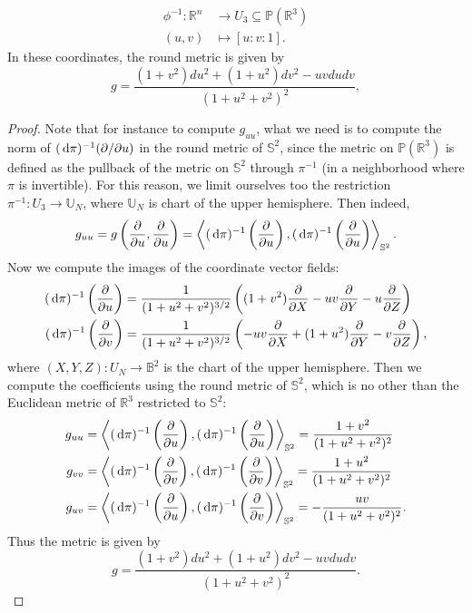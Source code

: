 \documentclass{report}
\begin{document}
\begin{itemize}
    \begin{align*}
        \phi^{-1}: \mathbb R^n &\to U_3 \subseteq \mathbb P(\mathbb R^3)\\
        (u,v) &\mapsto [u:v:1].
    \end{align*}
    In these coordinates, the round metric is given by
    \[
    g = \frac{(1 + v^2) du^2 + (1 + u^2) dv^2 - uv du dv}{(1 + u^2 + v^2)^2},
    \]
    \begin{proof}
        Note that for instance to compute $g_{uu}$, what we need is to compute the norm of $(\,\mathrm{d} \pi)^{-1}(\partial/\partial u)$ in the round metric of $\mathbb S^2$, since the metric on $\mathbb P(\mathbb R^3)$ is defined as the pullback of the metric on $\mathbb S^2$ through $\pi^{-1}$ (in a neighborhood where $\pi$ is invertible).
        For this reason, we limit ourselves too the restriction $\pi^{-1}: U_3 \to \mathbb U_N$, where $\mathbb U_N$ is chart of the upper hemisphere.
        Then indeed,
        \[
        g_{uu} = g\left(\frac{\partial}{\partial u}, \frac{\partial}{\partial u}\right) = 
        \left\langle (\,\mathrm{d} \pi)^{-1}\left(\frac{\partial}{\partial u}\right), (\,\mathrm{d} \pi)^{-1}\left(\frac{\partial}{\partial u}\right) \right\rangle_{\mathbb S^2}.
        \]
        Now we compute the images of the coordinate vector fields:
        \begin{align*}
            (\,\mathrm{d} \pi)^{-1}\left(\frac{\partial}{\partial u}\right) &= \frac{1}{(1+ u^2 + v^2)^{3/2}} \left((1 + v^2) \frac{\partial}{\partial X} - uv \frac{\partial}{\partial Y} - u \frac{\partial}{\partial Z}\right)\\
            (\,\mathrm{d} \pi)^{-1}\left(\frac{\partial}{\partial v}\right) &= \frac{1}{(1+ u^2 + v^2)^{3/2}} \left(-uv \frac{\partial}{\partial X} + (1 + u^2) \frac{\partial}{\partial Y} - v \frac{\partial}{\partial Z}\right),
        \end{align*}
        where $(X,Y,Z): U_N \to \mathbb B^2$ is the chart of the upper hemisphere.
        Then we compute the coefficients using the round metric of $\mathbb S^2$, which is no other than the Euclidean metric of $\mathbb R^3$ restricted to $\mathbb S^2$:
    \begin{align*}
        g_{uu} &= \left\langle (\,\mathrm{d} \pi)^{-1}\left(\frac{\partial}{\partial u}\right), (\,\mathrm{d} \pi)^{-1}\left(\frac{\partial}{\partial u}\right) \right\rangle_{\mathbb S^2} = \frac{1 + v^2}{(1 + u^2 + v^2)^2}\\
        g_{vv} &= \left\langle (\,\mathrm{d} \pi)^{-1}\left(\frac{\partial}{\partial v}\right), (\,\mathrm{d} \pi)^{-1}\left(\frac{\partial}{\partial v}\right) \right\rangle_{\mathbb S^2} = \frac{1 + u^2}{(1 + u^2 + v^2)^2}\\
        g_{uv} &= \left\langle (\,\mathrm{d} \pi)^{-1}\left(\frac{\partial}{\partial u}\right), (\,\mathrm{d} \pi)^{-1}\left(\frac{\partial}{\partial v}\right) \right\rangle_{\mathbb S^2} = - \frac{uv}{(1 + u^2 + v^2)^2}.
    \end{align*}
    Thus the metric is given by
    \[
    g = \frac{(1 + v^2) du^2 + (1 + u^2) dv^2 - uv du dv}{(1 + u^2 + v^2)^2}.
    \]
    \end{proof}
\end{itemize}
\end{document}
